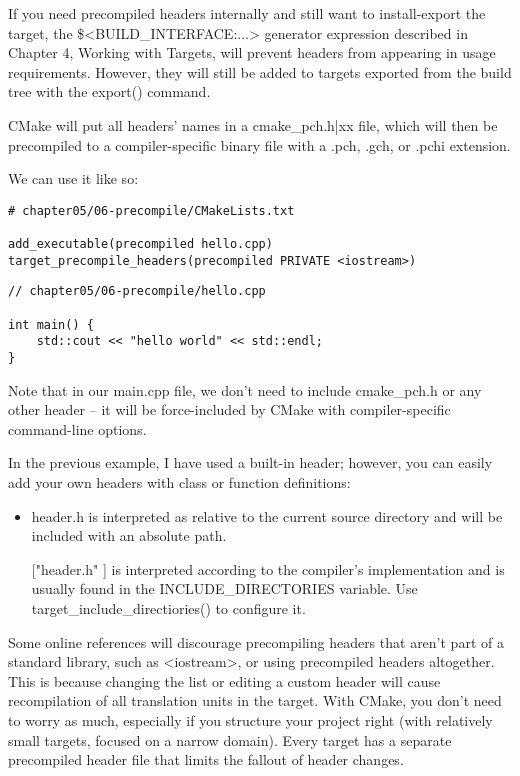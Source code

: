 \begin{tcolorbox}[colback=blue!5!white,colframe=blue!75!black,title=Important Note]
If you need precompiled headers internally and still want to install-export the target, the \$<BUILD\_INTERFACE:...> generator expression described in Chapter 4, Working with Targets, will prevent headers from appearing in usage requirements. However, they will still be added to targets exported from the build tree with the export() command.
\end{tcolorbox}

CMake will put all headers' names in a cmake\_pch.h|xx file, which will then be precompiled to a compiler-specific binary file with a .pch, .gch, or .pchi extension.

We can use it like so:

\begin{lstlisting}[style=styleCMake]
# chapter05/06-precompile/CMakeLists.txt

add_executable(precompiled hello.cpp)
target_precompile_headers(precompiled PRIVATE <iostream>)
\end{lstlisting}

\begin{lstlisting}[style=styleCXX]
// chapter05/06-precompile/hello.cpp

int main() {
	std::cout << "hello world" << std::endl;
}
\end{lstlisting} 

Note that in our main.cpp file, we don't need to include cmake\_pch.h or any other header – it will be force-included by CMake with compiler-specific command-line options.

In the previous example, I have used a built-in header; however, you can easily add your own headers with class or function definitions:

\begin{itemize}
\item 
header.h is interpreted as relative to the current source directory and will be included with an absolute path.

\item 
[["header.h"]] is interpreted according to the compiler's implementation and is usually found in the INCLUDE\_DIRECTORIES variable. Use target\_include\_directiories() to configure it.
\end{itemize}

Some online references will discourage precompiling headers that aren't part of a standard library, such as <iostream>, or using precompiled headers altogether.  This is because changing the list or editing a custom header will cause recompilation of all translation units in the target. With CMake, you don't need to worry as much, especially if you structure your project right (with relatively small targets, focused on a narrow domain). Every target has a separate precompiled header file that limits the fallout of header changes.

